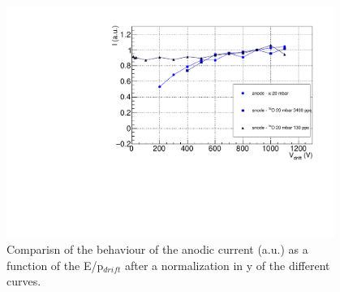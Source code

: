 \documentclass[a4paper, 11 pt]{report}
\newcommand{\Edrift}{E/p$_{drift}$}
\begin{document}
  \begin{figure}[htbp]
	\centering
	\includegraphics[width=0.95\textwidth]{Immagini/driftScan_FULL_20mbar_comp.pdf}
	\caption{Comparisn of the behaviour of the anodic current (a.u.) as a function of the \Edrift 
	after a normalization in y of the different curves.}
	\label{fig:DriftScan_FULL_beam}
  \end{figure}

  \clearpage
\end{document}
